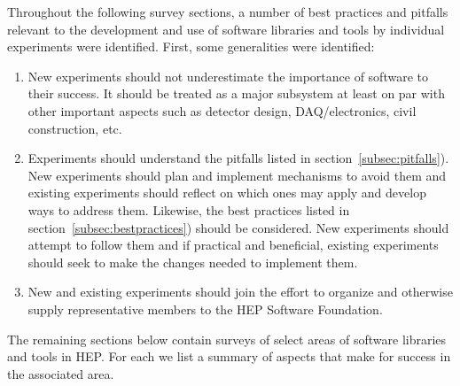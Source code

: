 Throughout the following survey sections, a number of best practices
and pitfalls relevant to the development and use of software libraries
and tools by individual experiments were identified.  First, some
generalities were identified:

\begin{enumerate}

\item New experiments should not underestimate the importance of
  software to their success.  It should be treated as a major
  subsystem at least on par with other important aspects such as
  detector design, DAQ/electronics, civil construction, etc.

\item Experiments should understand the pitfalls listed in
  section~\ref{subsec:pitfalls}).  New experiments should plan and
  implement mechanisms to avoid them and existing experiments should
  reflect on which ones may apply and develop ways to address them.
  Likewise, the best practices listed in
  section~\ref{subsec:bestpractices}) should be considered.  New
  experiments should attempt to follow them and if practical and
  beneficial, existing experiments should seek to make the changes
  needed to implement them.

\item New and existing experiments should join the effort to organize
  and otherwise supply representative members to the HEP Software
  Foundation.

\end{enumerate}

\noindent The remaining sections below contain surveys of select areas
of software libraries and tools in HEP.  For each we list a summary of
aspects that make for success in the associated area.

